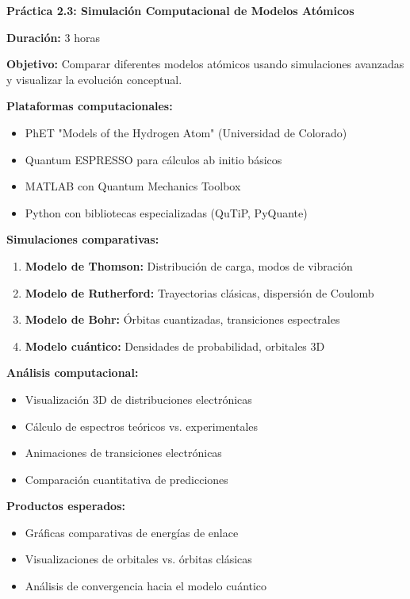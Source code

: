 \begin{tecnologiabox}
\begin{tecnologiabox}
\begin{tecnologiabox}
\begin{teknologiabox}
\begin{practicabox}
\textbf{Práctica 2.3: Simulación Computacional de Modelos Atómicos}

\textbf{Duración:} 3 horas

\textbf{Objetivo:} Comparar diferentes modelos atómicos usando simulaciones avanzadas y visualizar la evolución conceptual.

\textbf{Plataformas computacionales:}
\begin{itemize}
\item PhET "Models of the Hydrogen Atom" (Universidad de Colorado)
\item Quantum ESPRESSO para cálculos ab initio básicos
\item MATLAB con Quantum Mechanics Toolbox
\item Python con bibliotecas especializadas (QuTiP, PyQuante)
\end{itemize}

\textbf{Simulaciones comparativas:}
\begin{enumerate}
\item \textbf{Modelo de Thomson:} Distribución de carga, modos de vibración
\item \textbf{Modelo de Rutherford:} Trayectorias clásicas, dispersión de Coulomb
\item \textbf{Modelo de Bohr:} Órbitas cuantizadas, transiciones espectrales
\item \textbf{Modelo cuántico:} Densidades de probabilidad, orbitales 3D
\end{enumerate}

\textbf{Análisis computacional:}
\begin{itemize}
\item Visualización 3D de distribuciones electrónicas
\item Cálculo de espectros teóricos vs. experimentales
\item Animaciones de transiciones electrónicas
\item Comparación cuantitativa de predicciones
\end{itemize}

\textbf{Productos esperados:}
\begin{itemize}
\item Gráficas comparativas de energías de enlace
\item Visualizaciones de orbitales vs. órbitas clásicas
\item Análisis de convergencia hacia el modelo cuántico
\end{itemize}


\end{practicabox}
\end{teknologiabox}
\end{tecnologiabox}
\end{tecnologiabox}
\end{tecnologiabox}
